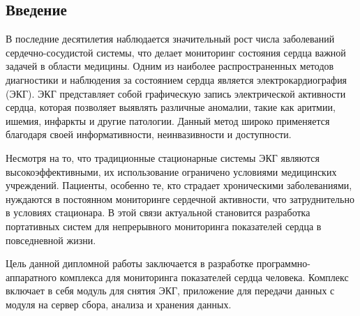\documentclass[12pt, russian]{extarticle}
\begin{document}

\begin{spacing}{1.5}

\tableofcontents
\thispagestyle{empty}
\newpage

\pagestyle{plain}
\setcounter{page}{3}

\section{Введение}

В последние десятилетия наблюдается значительный рост числа заболеваний сердечно-сосудистой системы, что делает мониторинг состояния сердца важной задачей в области медицины. Одним из наиболее распространенных методов диагностики и наблюдения за состоянием сердца является электрокардиография (ЭКГ). ЭКГ представляет собой графическую запись электрической активности сердца, которая позволяет выявлять различные аномалии, такие как аритмии, ишемия, инфаркты и другие патологии. Данный метод широко применяется благодаря своей информативности, неинвазивности и доступности.

Несмотря на то, что традиционные стационарные системы ЭКГ являются высокоэффективными, их использование ограничено условиями медицинских учреждений. Пациенты, особенно те, кто страдает хроническими заболеваниями, нуждаются в постоянном мониторинге сердечной активности, что затруднительно в условиях стационара. В этой связи актуальной становится разработка портативных систем для непрерывного мониторинга показателей сердца в повседневной жизни.

Цель данной дипломной работы заключается в разработке программно-аппаратного комплекса для мониторинга показателей сердца человека. Комплекс включает в себя модуль для снятия ЭКГ, приложение для передачи данных с модуля на сервер сбора, анализа и хранения данных.




\end{spacing}
\end{document}
